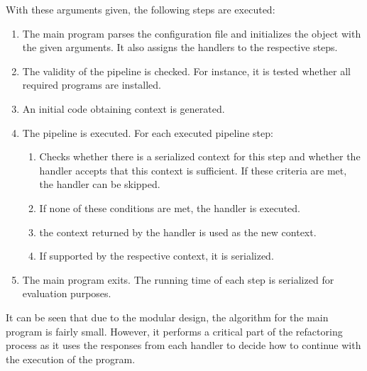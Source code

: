 With these arguments given, the following steps are executed:

\begin{enumerate}
    \item The main program parses the configuration file and initializes the object with the given arguments. It also assigns the handlers to the respective steps.
    \item  The validity of the pipeline is checked. For instance, it is tested whether all required programs are installed.
    \item An initial code obtaining context is generated.
    \item The pipeline is executed. For each executed pipeline step:
    \begin{enumerate}
        \item Checks whether there is a serialized context for this step and whether the handler accepts that this context is sufficient. If these criteria are met, the handler can be skipped.
        \item If none of these conditions are met, the handler is executed.
        \item the context returned by the handler is used as the new context.
        \item If supported by the respective context, it is serialized.
    \end{enumerate}
    \item The main program exits. The running time of each step is serialized for evaluation purposes. 
\end{enumerate}

It can be seen that due to the modular design, the algorithm for the main program is fairly small. However, it performs a critical part of the refactoring process as it uses the responses from each handler to decide how to continue with the execution of the program. 